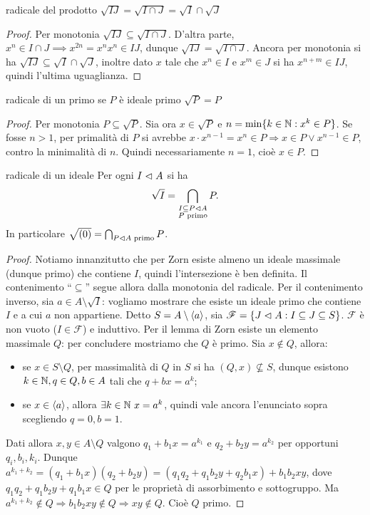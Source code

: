 \begin{proposition}{radicale del prodotto}
    $\sqrt{IJ} = \sqrt{I \cap J} = \sqrt{I} \cap \sqrt{J}$
\end{proposition}
\begin{proof}
    Per monotonia $\sqrt{IJ} \subseteq \sqrt{I \cap J}$. D'altra parte, $x^n \in I \cap J \implies x^{2n} = x^n x^n \in IJ$, dunque $\sqrt{IJ} = \sqrt{I \cap J}$. Ancora per monotonia si ha $\sqrt{IJ} \subseteq \sqrt{I} \cap \sqrt{J}$, inoltre dato $x$ tale che $x^n \in I$ e $x^m \in J$ si ha $x^{n+m} \in IJ$, quindi l'ultima uguaglianza.
\end{proof}
\begin{proposition}{radicale di un primo}
    se $P$ è ideale primo $\sqrt{P} = P$
\end{proposition}
\begin{proof}
    Per monotonia $P \subseteq \sqrt{P}$. Sia ora $x \in \sqrt{P}$ e $n = \min\{k \in \mathbb{N} : x^k \in P \}$. Se fosse $n > 1$, per primalità di $P$ si avrebbe $x \cdot x^{n-1} = x^n \in P \Rightarrow x \in P \lor x^{n-1} \in P$, contro la minimalità di $n$. Quindi necessariamente $n = 1$, cioè $x \in P$.
\end{proof}
\begin{proposition}{radicale di un ideale}
    Per ogni $I \vartriangleleft A$ si ha
    \[
    \sqrt{I} = \bigcap_{\substack{I \subseteq P \vartriangleleft A \\ P \text{ primo}}} P.
    \]
    In particolare $\sqrt{(0)} = \bigcap_{P \vartriangleleft A \text{ primo}} P$.
\end{proposition}
\begin{proof}
    Notiamo innanzitutto che per Zorn esiste almeno un ideale massimale (dunque primo) che contiene $I$, quindi l'intersezione è ben definita.
    Il contenimento ``$\subseteq$'' segue allora dalla monotonia del radicale.
    Per il contenimento inverso, sia $a \in A \setminus \sqrt{I}$: vogliamo mostrare che esiste un ideale primo che contiene $I$ e a cui $a$ non appartiene. Detto $S = A \setminus \langle a \rangle$, sia $\mathscr{F} = \{J \vartriangleleft A : I \subseteq J \subseteq S\}$. $\mathscr{F}$ è non vuoto ($I \in \mathscr{F}$) e induttivo. Per il lemma di Zorn esiste un elemento massimale $Q$: per concludere mostriamo che $Q$ è primo. Sia $x \notin Q$, allora:
    \begin{itemize}
        \item se $x \in S \setminus Q$, per massimalità di $Q$ in $S$ si ha $(Q,x) \nsubseteq S$, dunque esistono $k \in \mathbb{N}, q \in Q, b \in A$ tali che $q + bx = a^k$;
        \item se $x \in \langle a \rangle$, allora $\exists k \in \mathbb{N} \ x = a^k$, quindi vale ancora l'enunciato sopra scegliendo $q = 0, b = 1$.
    \end{itemize}
     Dati allora $x,y \in A \setminus Q$ valgono $q_1 + b_1 x = a^{k_1}$ e $q_2 + b_2 y = a^{k_2}$ per opportuni $q_i, b_i, k_i$. Dunque $a^{k_1 + k_2} = (q_1 + b_1 x)(q_2 + b_2 y) = (q_1 q_2 + q_1 b_2 y + q_2 b_1 x) + b_1 b_2 x y$, dove $q_1 q_2 + q_1 b_2 y + q_1 b_1 x \in Q$ per le proprietà di assorbimento e sottogruppo. Ma $a^{k_1 + k_2} \notin Q \Rightarrow b_1 b_2 x y \notin Q \Rightarrow xy \notin Q$. Cioè $Q$ primo.
\end{proof}

